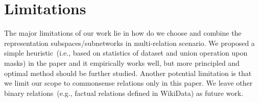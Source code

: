 \section{Limitations}
The major limitations of our work lie in how do we choose and combine the representation subspaces/subnetworks in
multi-relation scenario. We proposed a simple heuristic~(i.e., based on statistics of dataset and union operation upon masks) in the paper and it empirically works well, but more principled and optimal method should be 
further studied. Another potential limitation is that we limit our scope to commonsense relations only in this paper. We leave other binary relations~(e.g., factual relations defined in WikiData) as future work.
